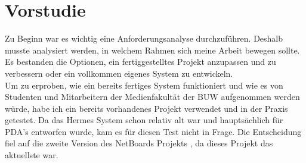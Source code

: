 \chapter{Vorstudie}\label{Vorstudie}
Zu Beginn war es wichtig eine Anforderungsanalyse durchzuführen. Deshalb musste analysiert werden, in welchem Rahmen sich meine Arbeit bewegen sollte. Es bestanden die Optionen, ein fertiggestelltes Projekt anzupassen und zu verbessern oder ein vollkommen eigenes System zu entwickeln.
\\
Um zu erproben, wie ein bereits fertiges System funktioniert und wie es von Studenten und Mitarbeitern der Medienfakultät der BUW aufgenommen werden würde, habe ich ein bereits vorhandenes Projekt verwendet und in der Praxis getestet.
Da das Hermes System schon relativ alt war und hauptsächlich für PDA's entworfen wurde, kam es für diesen Test nicht in Frage.
Die Entscheidung fiel auf die zweite Version des NetBoards Projekts \cite{netboards:website}, da dieses Projekt das aktuellste war.
